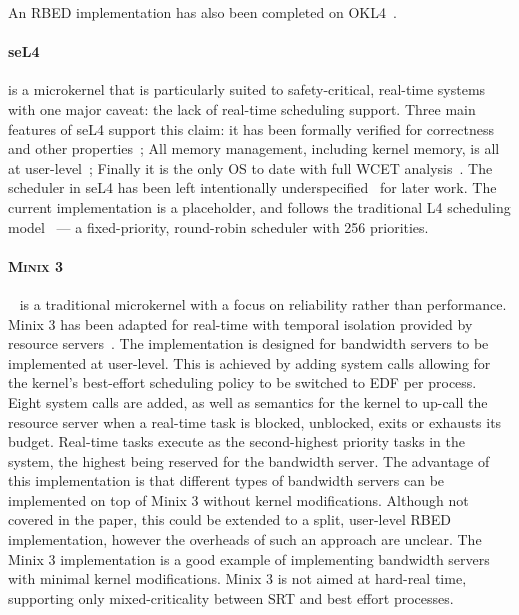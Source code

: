 An \gls{RBED} implementation has also been completed on OKL4~\citep{Petters_LHE_09}.

\paragraph{seL4} is a microkernel that is particularly suited to safety-critical, real-time systems with one major caveat: the lack of real-time scheduling support.
Three main features of seL4 support this claim: it has been formally verified for correctness~\citep{Klein_EHACDEEKNSTW_09} and other properties~\citep{Sewell_WGMAK_11}; All memory management, including kernel memory, is all at user-level~\citep{Elkaduwe_Derrin_06}; Finally it is the only \gls{OS} to date with full \gls{WCET} analysis~\citep{Blackham_SCRH_11}.
The scheduler in seL4 has been left intentionally underspecified~\citep{Petters_EH_12} for later work.
The current implementation is a placeholder, and follows the traditional L4 scheduling model~\citep{Ruocco_06} --- a fixed-priority, round-robin scheduler with 256 priorities.

\paragraph{\textsc{Minix 3}}~\citep{Herder_BGHT_06} is a traditional microkernel with a focus on reliability rather than performance.
{\sc Minix 3} has been adapted for real-time with temporal isolation provided by resource servers~\citep{Mancina_LFHGT_2009}.
 The implementation is designed for bandwidth servers to be implemented at user-level. 
This is achieved by adding system calls allowing for the kernel's best-effort scheduling policy to be switched to \gls{EDF} per process. 
Eight system calls are added, as well as semantics for the kernel to up-call the resource server when a real-time task is blocked, unblocked, exits or exhausts its budget.
Real-time tasks execute as the second-highest priority tasks in the system, the highest being reserved for the bandwidth server. 
The advantage of this implementation is that different types of bandwidth servers can be implemented on top of {\sc Minix 3} without kernel modifications.
 Although not covered in the paper, this could be extended to a split, user-level \gls{RBED} implementation, however the overheads of such an approach are unclear. 
The {\sc Minix 3} implementation is a good example of implementing bandwidth servers with minimal kernel modifications.
 {\sc Minix 3} is not aimed at hard-real time, supporting only mixed-criticality between \gls{SRT} and best effort processes.


